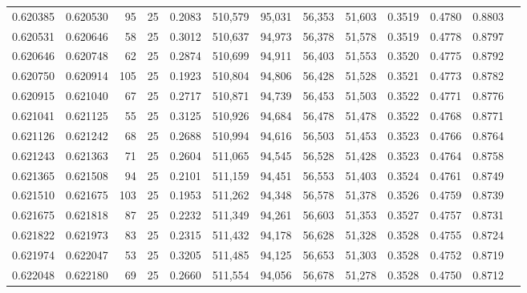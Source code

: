 \begin{tabular}{rrrrrrrrrrrrr}
0.620385 & 0.620530 &    95 &  25 &                                     0.2083 & 510,579 &  95,031 &  56,353 &  51,603 & 0.3519 & 0.4780 & 0.8803 \\
0.620531 & 0.620646 &    58 &  25 &                                     0.3012 & 510,637 &  94,973 &  56,378 &  51,578 & 0.3519 & 0.4778 & 0.8797 \\
0.620646 & 0.620748 &    62 &  25 &                                     0.2874 & 510,699 &  94,911 &  56,403 &  51,553 & 0.3520 & 0.4775 & 0.8792 \\
0.620750 & 0.620914 &   105 &  25 &                                     0.1923 & 510,804 &  94,806 &  56,428 &  51,528 & 0.3521 & 0.4773 & 0.8782 \\
0.620915 & 0.621040 &    67 &  25 &                                     0.2717 & 510,871 &  94,739 &  56,453 &  51,503 & 0.3522 & 0.4771 & 0.8776 \\
0.621041 & 0.621125 &    55 &  25 &                                     0.3125 & 510,926 &  94,684 &  56,478 &  51,478 & 0.3522 & 0.4768 & 0.8771 \\
0.621126 & 0.621242 &    68 &  25 &                                     0.2688 & 510,994 &  94,616 &  56,503 &  51,453 & 0.3523 & 0.4766 & 0.8764 \\
0.621243 & 0.621363 &    71 &  25 &                                     0.2604 & 511,065 &  94,545 &  56,528 &  51,428 & 0.3523 & 0.4764 & 0.8758 \\
0.621365 & 0.621508 &    94 &  25 &                                     0.2101 & 511,159 &  94,451 &  56,553 &  51,403 & 0.3524 & 0.4761 & 0.8749 \\
0.621510 & 0.621675 &   103 &  25 &                                     0.1953 & 511,262 &  94,348 &  56,578 &  51,378 & 0.3526 & 0.4759 & 0.8739 \\
0.621675 & 0.621818 &    87 &  25 &                                     0.2232 & 511,349 &  94,261 &  56,603 &  51,353 & 0.3527 & 0.4757 & 0.8731 \\
0.621822 & 0.621973 &    83 &  25 &                                     0.2315 & 511,432 &  94,178 &  56,628 &  51,328 & 0.3528 & 0.4755 & 0.8724 \\
0.621974 & 0.622047 &    53 &  25 &                                     0.3205 & 511,485 &  94,125 &  56,653 &  51,303 & 0.3528 & 0.4752 & 0.8719 \\
0.622048 & 0.622180 &    69 &  25 &                                     0.2660 & 511,554 &  94,056 &  56,678 &  51,278 & 0.3528 & 0.4750 & 0.8712 \\

\end{tabular}
